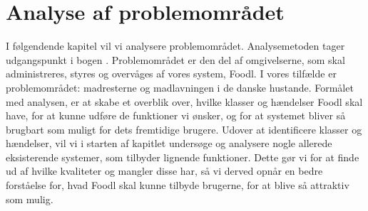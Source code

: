 \chapter{Analyse af problemområdet}
\label{chap:analyseafpo}

I følgendende kapitel vil vi analysere problemområdet. Analysemetoden tager udgangspunkt i bogen \cite[s. ~43]{ooad}. Problemområdet er den del af omgivelserne, som skal administreres, styres og overvåges af vores system, Foodl. I vores tilfælde er problemområdet: madresterne og madlavningen i de danske hustande. Formålet med analysen, er at skabe et overblik over, hvilke klasser og hændelser Foodl skal have, for at kunne udføre de funktioner vi ønsker, og for at systemet bliver så brugbart som muligt for dets fremtidige brugere. Udover at identificere klasser og hændelser, vil vi i starten af kapitlet undersøge og analysere nogle allerede eksisterende systemer, som tilbyder lignende funktioner. Dette gør vi for at finde ud af hvilke kvaliteter og mangler disse har, så vi derved opnår en bedre forståelse for, hvad Foodl skal kunne tilbyde brugerne, for at blive så attraktiv som mulig.



 
            
        


